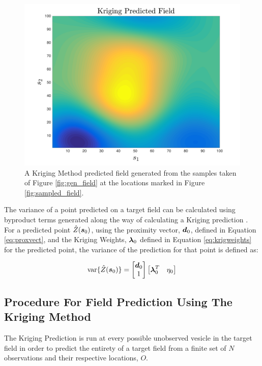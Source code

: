 \begin{figure}[!]
    \centering
    \includegraphics[width=0.8\linewidth]{figures/kriging_prediction.png}
    \ssp
    \caption{A Kriging Method predicted field generated from the samples taken of Figure \ref{fig:gen_field} at the locations marked in Figure \ref{fig:sampled_field}.}
    \label{fig:krig_field}
\end{figure}

The variance of a point predicted on a target field can be calculated using byproduct terms generated along the way of calculating a Kriging prediction \cite{felus:srn}. For a predicted point $\hat{Z}({\it{\boldsymbol{s}}}_0)$, using the proximity vector, ${\it{\boldsymbol{d}}}_0$, defined in Equation \ref{eq:proxvect}, and the Kriging Weights, ${\it{\boldsymbol{\lambda}}}_0$ defined in Equation \ref{eq:krigweights} for the predicted point, the variance of the prediction for that point is defined as:

\begin{equation}
    \label{eq:krigvar}
    \text{var}\{\hat{Z}({\it{\boldsymbol{s}}}_0)\} = \begin{bmatrix}{\it{\boldsymbol{d}}}_0 \\ 1\end{bmatrix} \begin{bmatrix}{\it{\boldsymbol{\lambda}}}_0^T & \eta_0 \end{bmatrix}
\end{equation}

\subsection{Procedure For Field Prediction Using The Kriging Method}
The Kriging Prediction is run at every possible unobserved vesicle in the target field in order to predict the entirety of a target field from a finite set of $N$ observations and their respective locations, $O$.

